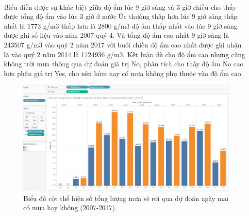 \documentclass{article}
\begin{document}
\paragraph{}Biểu diễn được sự khác biệt giữa độ ẩm lúc 9 giờ sáng và 3 giờ chiều cho thấy được tổng độ ẩm vào lúc 3 giờ ở nước Úc thường thấp hơn lúc 9 giờ sáng thấp nhất là 1773 g/m3 thấp hơn là 2800 g/m3 độ ẩm thấp nhất vào lúc 9 giờ sáng được ghi số liệu vào năm 2007 quý 4. Và tổng độ ẩm cao nhất 9 giờ sáng là 243507 g/m3 vào quý 2 năm 2017 với buổi chiều độ ẩm cao nhất được ghi nhận là vào quý 2 năm 2014 là 1724936 g/m3. Kết luận dù cho độ ẩm cao nhưng cũng không trời mưa thông qua dự đoán giá trị No, phân tích cho thấy độ ẩm No cao hơn phần giá trị Yes, cho nên hôm nay có mưa không phụ thuộc vào độ ẩm cao.
\pagebreak{}
\begin{figure}[!h]
	\begin{center}
		\includegraphics[width=\linewidth]{images/tableau2.png}
		\caption{\fontsize{14}{20}\selectfont Biểu đồ cột thể hiện số tổng lượng mưa sẽ rơi qua dự đoán ngày mai có mưa hay không (2007-2017).}
	\end{center}
\end{figure}
\end{document}
